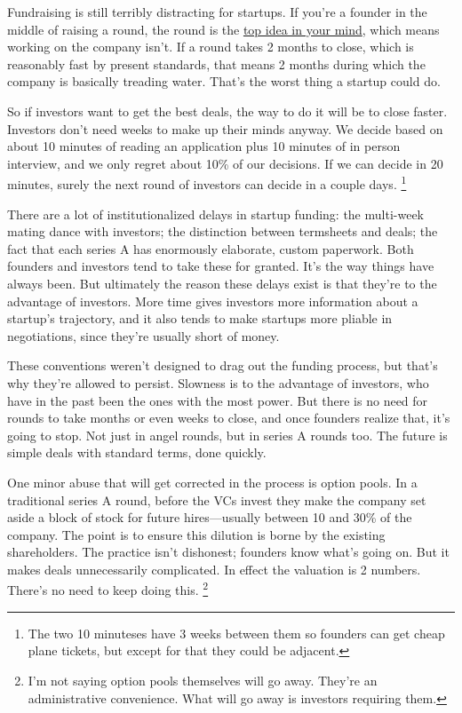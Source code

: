\documentclass[12pt]{book}
\begin{document}
Fundraising is still terribly distracting for startups. If you're a
founder in the middle of raising a round, the round is the
\href{top.html}{top idea in your mind}, which means working on the
company isn't. If a round takes 2 months to close, which is reasonably
fast by present standards, that means 2 months during which the company
is basically treading water. That's the worst thing a startup could do.

So if investors want to get the best deals, the way to do it will be to
close faster. Investors don't need weeks to make up their minds anyway.
We decide based on about 10 minutes of reading an application plus 10
minutes of in person interview, and we only regret about 10\% of our
decisions. If we can decide in 20 minutes, surely the next round of
investors can decide in a couple days. \footnote{The two 10 minuteses have 3 weeks between them so founders can
get cheap plane tickets, but except for that they could be adjacent.}

There are a lot of institutionalized delays in startup funding: the
multi-week mating dance with investors; the distinction between
termsheets and deals; the fact that each series A has enormously
elaborate, custom paperwork. Both founders and investors tend to take
these for granted. It's the way things have always been. But ultimately
the reason these delays exist is that they're to the advantage of
investors. More time gives investors more information about a startup's
trajectory, and it also tends to make startups more pliable in
negotiations, since they're usually short of money.

These conventions weren't designed to drag out the funding process, but
that's why they're allowed to persist. Slowness is to the advantage of
investors, who have in the past been the ones with the most power. But
there is no need for rounds to take months or even weeks to close, and
once founders realize that, it's going to stop. Not just in angel
rounds, but in series A rounds too. The future is simple deals with
standard terms, done quickly.

One minor abuse that will get corrected in the process is option pools.
In a traditional series A round, before the VCs invest they make the
company set aside a block of stock for future hires---usually between 10
and 30\% of the company. The point is to ensure this dilution is borne
by the existing shareholders. The practice isn't dishonest; founders
know what's going on. But it makes deals unnecessarily complicated. In
effect the valuation is 2 numbers. There's no need to keep doing this.
\footnote{I'm not saying option pools themselves will go away. They're an
administrative convenience. What will go away is investors requiring
them.}
\end{document}
